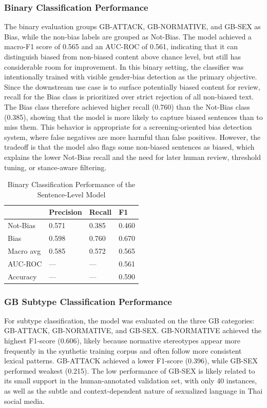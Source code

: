 \documentclass[12pt,oneside,openright,a4paper]{cpe-english-project}
\begin{document}
\subsubsection{Binary Classification Performance}

The binary evaluation groups GB-ATTACK, GB-NORMATIVE, and GB-SEX as Bias, while the non-bias labels are grouped as Not-Bias. The model achieved a macro-F1 score of 0.565 and an AUC-ROC of 0.561, indicating that it can distinguish biased from non-biased content above chance level, but still has considerable room for improvement. In this binary setting, the classifier was intentionally trained with visible gender-bias detection as the primary objective. Since the downstream use case is to surface potentially biased content for review, recall for the Bias class is prioritized over strict rejection of all non-biased text. The Bias class therefore achieved higher recall (0.760) than the Not-Bias class (0.385), showing that the model is more likely to capture biased sentences than to miss them. This behavior is appropriate for a screening-oriented bias detection system, where false negatives are more harmful than false positives. However, the tradeoff is that the model also flags some non-biased sentences as biased, which explains the lower Not-Bias recall and the need for later human review, threshold tuning, or stance-aware filtering.

\begin{table}[H]
\centering
\small
\caption{Binary Classification Performance of the Sentence-Level Model}
\begin{tabular}{@{}llll@{}}
\toprule
 & Precision & Recall & F1 \\
\midrule
Not-Bias & 0.571 & 0.385 & 0.460 \\
Bias & 0.598 & 0.760 & 0.670 \\
Macro avg & 0.585 & 0.572 & 0.565 \\
AUC-ROC & --- & --- & 0.561 \\
Accuracy & --- & --- & 0.590 \\
\bottomrule
\end{tabular}
\end{table}

\subsubsection{GB Subtype Classification Performance}

For subtype classification, the model was evaluated on the three GB categories: GB-ATTACK, GB-NORMATIVE, and GB-SEX. GB-NORMATIVE achieved the highest F1-score (0.606), likely because normative stereotypes appear more frequently in the synthetic training corpus and often follow more consistent lexical patterns. GB-ATTACK achieved a lower F1-score (0.396), while GB-SEX performed weakest (0.215). The low performance of GB-SEX is likely related to its small support in the human-annotated validation set, with only 40 instances, as well as the subtle and context-dependent nature of sexualized language in Thai social media.
\end{document}
